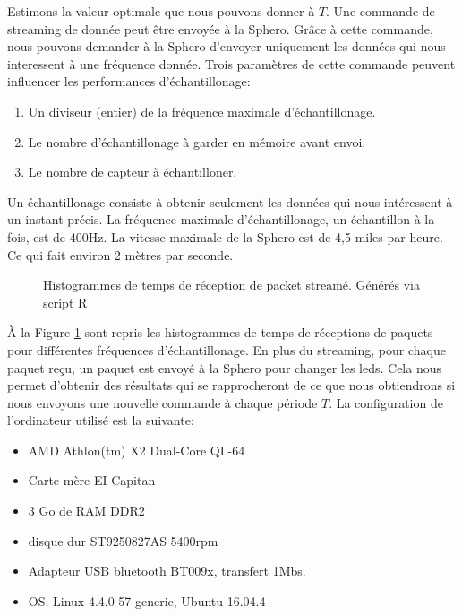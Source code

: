 Estimons la valeur optimale que nous pouvons donner à $T$.
Une commande de streaming de donnée peut être envoyée à la Sphero.
Grâce à cette commande, nous pouvons demander à la Sphero d'envoyer uniquement les données qui nous interessent à une fréquence donnée.
Trois paramètres de cette commande peuvent influencer les performances d'échantillonage:
\begin{enumerate}
 \item Un diviseur (entier) de la fréquence maximale d'échantillonage.
 \item Le nombre d'échantillonage à garder en mémoire avant envoi.
 \item Le nombre de capteur à échantilloner.
\end{enumerate}
Un échantillonage consiste à obtenir seulement les données qui nous intéressent à un instant précis.
La fréquence maximale d'échantillonage, un échantillon à la fois, est de 400Hz.\cite{SDKofficiels}
La vitesse maximale de la Sphero est de 4,5 miles par heure.\cite{product} Ce qui fait environ 2 mètres par seconde.
\begin{figure}
 \centering
 \caption{Histogrammes de temps de réception de packet streamé. Générés via script R}
 \label{histogrammes}
\end{figure}

À la Figure \ref{histogrammes} sont repris les histogrammes de temps de réceptions de paquets pour différentes fréquences d'échantillonage.
En plus du streaming, pour chaque paquet reçu, un paquet est envoyé à la Sphero pour changer les leds.
Cela nous permet d'obtenir des résultats qui se rapprocheront de ce que nous obtiendrons si nous envoyons une nouvelle commande à chaque période $T$.
La configuration de l'ordinateur utilisé est la suivante:
\begin{itemize}
 \item AMD Athlon(tm) X2 Dual-Core QL-64
 \item Carte mère EI Capitan
 \item 3 Go de RAM DDR2
 \item disque dur ST9250827AS 5400rpm
 \item Adapteur USB bluetooth BT009x, transfert 1Mbs.
 \item OS: Linux 4.4.0-57-generic, Ubuntu 16.04.4
\end{itemize}

